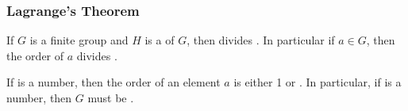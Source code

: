 \subsubsection{Lagrange's Theorem}\label{subsubsec:Lagranges_Theorem}
\begin{theorem}\label{thm:Lagranges_Theorem}
  If $G$ is a finite group and $H$ is a  of $G$, then  divides .
  In particular if $a \in G$, then the order of $a$ divides .
\end{theorem}

\begin{remark*}
  If  is a  number, then the order of an element $a$ is either 1 or .
  In particular, if  is a  number, then $G$ must be .
\end{remark*}

